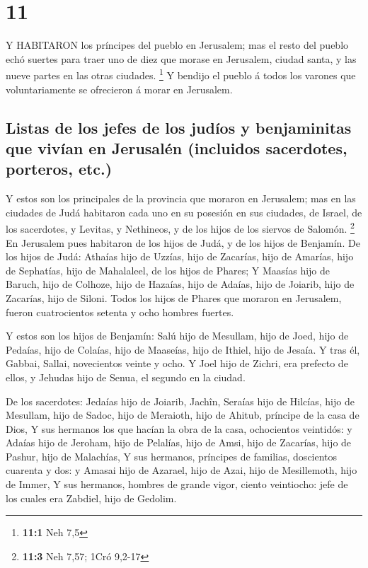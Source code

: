 \hypertarget{section-10}{%
\section{11}\label{section-10}}

 Y HABITARON los príncipes del pueblo en Jerusalem; mas el
resto del pueblo echó suertes para traer uno de diez que morase en
Jerusalem, ciudad santa, y las nueve partes en las otras ciudades.
\footnote{\textbf{11:1} Neh 7,5}  Y bendijo el pueblo á
todos los varones que voluntariamente se ofrecieron á morar en
Jerusalem.

\hypertarget{listas-de-los-jefes-de-los-juduxedos-y-benjaminitas-que-vivuxedan-en-jerusaluxe9n-incluidos-sacerdotes-porteros-etc.}{%
\subsection{Listas de los jefes de los judíos y benjaminitas que vivían
en Jerusalén (incluidos sacerdotes, porteros,
etc.)}\label{listas-de-los-jefes-de-los-juduxedos-y-benjaminitas-que-vivuxedan-en-jerusaluxe9n-incluidos-sacerdotes-porteros-etc.}}

 Y estos son los principales de la provincia que moraron en
Jerusalem; mas en las ciudades de Judá habitaron cada uno en su posesión
en sus ciudades, de Israel, de los sacerdotes, y Levitas, y Nethineos, y
de los hijos de los siervos de Salomón. \footnote{\textbf{11:3} Neh
  7,57; 1Cró 9,2-17}  En Jerusalem pues habitaron de los
hijos de Judá, y de los hijos de Benjamín. De los hijos de Judá: Athaías
hijo de Uzzías, hijo de Zacarías, hijo de Amarías, hijo de Sephatías,
hijo de Mahalaleel, de los hijos de Phares;  Y Maasías hijo
de Baruch, hijo de Colhoze, hijo de Hazaías, hijo de Adaías, hijo de
Joiarib, hijo de Zacarías, hijo de Siloni.  Todos los hijos
de Phares que moraron en Jerusalem, fueron cuatrocientos setenta y ocho
hombres fuertes.

 Y estos son los hijos de Benjamín: Salú hijo de Mesullam,
hijo de Joed, hijo de Pedaías, hijo de Colaías, hijo de Maaseías, hijo
de Ithiel, hijo de Jesaía.  Y tras él, Gabbai, Sallai,
novecientos veinte y ocho.  Y Joel hijo de Zichri, era
prefecto de ellos, y Jehudas hijo de Senua, el segundo en la ciudad.

 De los sacerdotes: Jedaías hijo de Joiarib, Jachîn,
 Seraías hijo de Hilcías, hijo de Mesullam, hijo de Sadoc,
hijo de Meraioth, hijo de Ahitub, príncipe de la casa de Dios,
 Y sus hermanos los que hacían la obra de la casa,
ochocientos veintidós: y Adaías hijo de Jeroham, hijo de Pelalías, hijo
de Amsi, hijo de Zacarías, hijo de Pashur, hijo de Malachías,
 Y sus hermanos, príncipes de familias, doscientos cuarenta
y dos: y Amasai hijo de Azarael, hijo de Azai, hijo de Mesillemoth, hijo
de Immer,  Y sus hermanos, hombres de grande vigor, ciento
veintiocho: jefe de los cuales era Zabdiel, hijo de Gedolim.

